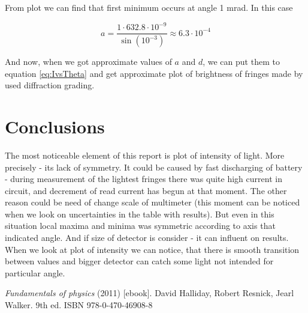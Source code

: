 \documentclass[a4paper,12pt]{article}
\begin{document}
From plot we can find that first minimum occurs at angle 1 mrad. In this case

\begin{displaymath}
    a = \frac{1 \cdot 632.8 \cdot 10^{-9}}{\sin(10^{-3})} \approx 6.3 \cdot 10^{-4}
\end{displaymath}

And now, when we got approximate values of $a$ and $d$, we can put them to equation \ref{eq:IvsTheta} and get approximate plot of brightness of fringes made by used diffraction grading.

\section{Conclusions}
The most noticeable element of this report is plot of intensity of light. More precisely - its lack of symmetry. It could be caused by fast discharging of battery - during measurement of the lightest fringes there was quite high current in circuit, and decrement of read current has begun at that moment. The other reason could be need of change scale of multimeter (this moment can be noticed when we look on uncertainties in the table with results). But even in this situation local maxima and minima was symmetric according to axis that indicated angle. And if size of detector is consider - it can influent on results. When we look at plot of intensity we can notice, that there is smooth transition between values and bigger detector can catch some light not intended for particular angle.       


\begin{thebibliography}{9}
    \emph{Fundamentals of physics} (2011) [ebook]. David Halliday, Robert Resnick, Jearl Walker. 9th ed. ISBN 978-0-470-46908-8
\end{thebibliography}
\end{document}
